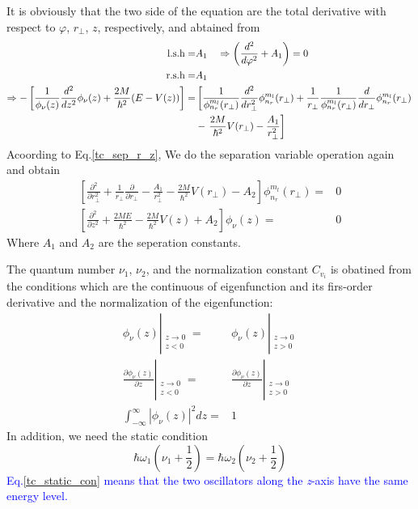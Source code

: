 It is obviously that the two side of the equation are the total derivative with respect to $\varphi$, $r_\perp$, $z$, respectively, and abtained from 
\begin{align}
\text{l.s.h} =& A_1 \quad \Rightarrow \left(\frac{d^2}{d\varphi^2} + A_1 \right) = 0  \\
\text{r.s.h} =& A_1 \\
\Rightarrow -\left[ \frac{1}{\phi_\nu(z)}\frac{d^2}{dz^2}\phi_{\nu}(z) + \frac{2M}{\hbar^2}(E - V(z)) \right] =& \left[  \frac{1}{\phi_{n_r}^{m_l}(r_\perp)} \frac{d^2}{d r_\perp^2} \phi_{n_r}^{m_l}(r_\perp)  + \frac{1}{r_\perp} \frac{1}{\phi_{n_r}^{m_l}(r_\perp)}\frac{d}{d r_\perp}\phi_{n_r}^{m_l}(r_\perp) \right. \label{tc_sep_r_z} \\
& - \left. \frac{2M}{\hbar^2} V(r_\perp) - \frac{A_1}{r_\perp^2} \right] \notag
\end{align}
Acoording to Eq.\eqref{tc_sep_r_z}, We do the separation variable operation again and obtain
\begin{equation}
\begin{aligned}
  \left[\frac{\partial^{2}}{\partial r_{\perp}^{2}}+\frac{1}{r_{\perp}} \frac{\partial}{\partial r_{\perp}}-\frac{A_{1}}{r_{\perp}^{2}}-\frac{2 M}{\hbar^{2}} V\left(r_{\perp}\right)-A_{2}\right] \phi_{n_{r}}^{m_{l}}\left(r_{\perp}\right)=& 0 \\
  \left[\frac{\partial^{2}}{\partial z^{2}}+\frac{2 M E}{\hbar^{2}}-\frac{2 M}{\hbar^{2}} V(z)+A_{2}\right] \phi_{\nu}(z)=& 0
\end{aligned}
\end{equation}
Where $A_1$ and $A_2$ are the seperation constants.

The quantum number $\nu_1$, $\nu_2$, and the normalization constant $C_{v_i}$ is obatined from the conditions which are the continuous of eigenfunction and its firs-order derivative and the normalization of the eigenfunction:
\begin{align}
\phi_{\nu}(z)\left|_{\substack{z \rightarrow 0 \\ z<0}}\right. =& \phi_{\nu}(z)\left|_{\substack{z \rightarrow 0 \\ z>0}} \right.  \label{tc_wave_con}\\
\frac{\partial\phi_\nu(z)}{\partial z} \left|_{\substack{z \rightarrow 0 \\ z< 0}} \right. =& \frac{\partial\phi_\nu(z)}{\partial z} \left|_{\substack{z \rightarrow 0 \\ z > 0}} \right. \label{tc_wave_one_order_con} \\  
\int_{-\infty}^{\infty} \left| \phi_\nu(z) \right| ^2 dz =& 1 \label{tc_wave_norm}
\end{align}
In addition, we need the static condition
\begin{equation}
\hbar\omega_1(\nu_1 + \frac{1}{2}) = \hbar\omega_2(\nu_2 + \frac{1}{2}) \label{tc_static_con}
\end{equation}
\textcolor{blue}{Eq.\eqref{tc_static_con} means that the two oscillators along the \textit{z}-axis have the same energy level.}

